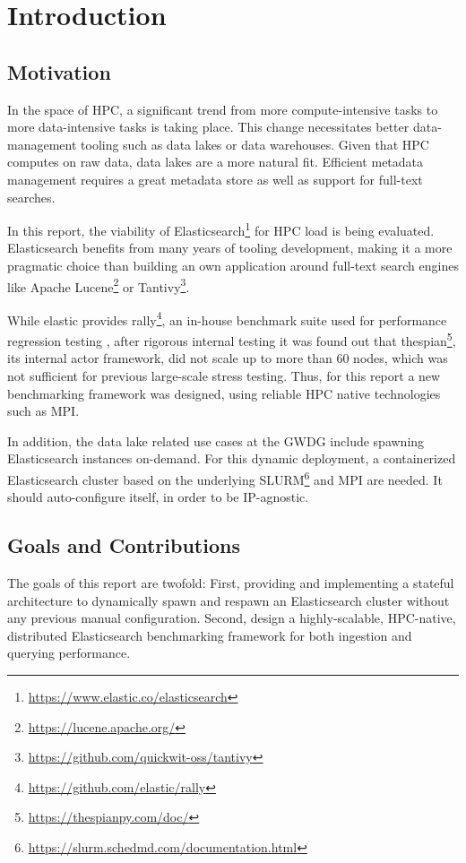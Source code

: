 \section{Introduction}
\subsection{Motivation}
In the space of \ac{HPC}, a significant trend from more compute-intensive tasks to more data-intensive tasks is taking place. This change necessitates better data-management tooling such as data lakes or data warehouses. Given that \ac{HPC} computes on raw data, data lakes are a more natural fit. Efficient metadata management requires a great metadata store as well as support for full-text searches.

In this report, the viability of Elasticsearch\footnote{\url{https://www.elastic.co/elasticsearch}} for \ac{HPC} load is being evaluated. Elasticsearch benefits from many years of tooling development, making it a more pragmatic choice than building an own application around full-text search engines like Apache Lucene\footnote{\url{https://lucene.apache.org/}} or Tantivy\footnote{\url{https://github.com/quickwit-oss/tantivy}}.

While elastic provides rally\footnote{\url{https://github.com/elastic/rally}}, an in-house benchmark suite used for performance regression testing \cite{es_benchmarking}, after rigorous internal testing it was found out that thespian\footnote{\url{https://thespianpy.com/doc/}}, its internal actor framework, did not scale up to more than 60 nodes, which was not sufficient for previous large-scale stress testing. Thus, for this report a new benchmarking framework was designed, using reliable \ac{HPC} native technologies such as \ac{MPI}.

In addition, the data lake related use cases at the GWDG include spawning Elasticsearch instances on-demand. For this dynamic deployment, a containerized Elasticsearch cluster based on the underlying \ac{SLURM}\footnote{\url{https://slurm.schedmd.com/documentation.html}} and \ac{MPI} are needed. It should auto-configure itself, in order to be IP-agnostic.
\subsection{Goals and Contributions}
The goals of this report are twofold: First, providing and implementing a stateful architecture to dynamically spawn and respawn an Elasticsearch cluster without any previous manual configuration. Second, design a highly-scalable, \ac{HPC}-native, distributed Elasticsearch benchmarking framework for both ingestion and querying performance. 

